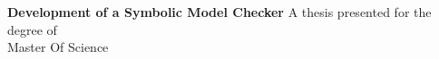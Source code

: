 \begin{titlepage}
		\vspace*{1cm}
		\textbf{Development of a Symbolic Model Checker}
		\vspace{1.5cm}
		\vfill
		A thesis presented for the degree of \\
		Master Of Science
\end{titlepage}